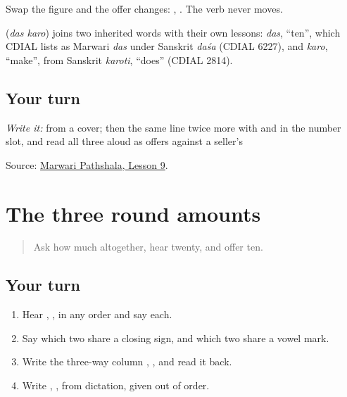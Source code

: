 Swap the figure and the offer changes: \textbf{ }, \textbf{ }. The verb never moves.

\begin{cousinweb}
\textbf{ } (\emph{das karo}) joins two inherited words with their own lessons: \emph{das}, \textquotedblleft{}ten\textquotedblright{}, which CDIAL lists as Marwari \emph{das} under Sanskrit \emph{daśa} (CDIAL 6227), and \emph{karo}, \textquotedblleft{}make\textquotedblright{}, from Sanskrit \emph{karoti}, \textquotedblleft{}does\textquotedblright{} (CDIAL 2814).
\end{cousinweb}

\subsection*{Your turn}
\emph{Write it:} \textbf{ } from a cover; then the same line twice more with \textbf{} and \textbf{} in the number slot, and read all three aloud as offers against a seller's \textbf{}

\begin{tcolorbox}[breakable,colback=teal!4,colframe=teal!35!black,title={Before you move on}]
Source: \href{https://www.marwaripathshala.com/marwari-lesson-9-english}{Marwari Pathshala, Lesson 9}.
\end{tcolorbox}
\section[Practice]{The three round amounts}

\label{lesson:MW-R34-round-recall}



\begin{quote}
Ask how much altogether, hear twenty, and offer ten.
\end{quote}

\subsection*{Your turn}
\begin{enumerate}
\raggedright
  \item Hear \textbf{}, \textbf{}, \textbf{} in any order and say each.
  \item Say which two share a closing sign, and which two share a vowel mark.
  \item Write the three-way column \textbf{}, \textbf{}, \textbf{} and read it back.
  \item Write \textbf{}, \textbf{}, \textbf{} from dictation, given out of order.
\end{enumerate}

